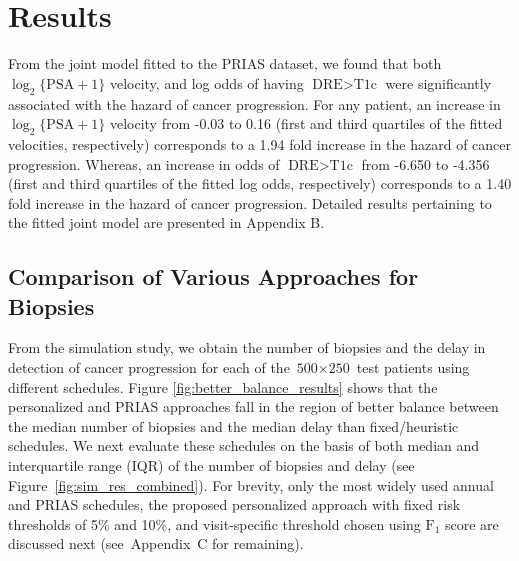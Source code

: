 
\section{Results}
\label{sec:results}
From the joint model fitted to the PRIAS dataset, we found that both $\log_2 \{\mbox{PSA} + 1\}$ velocity,  and log odds of having $\mbox{DRE} > \mbox{T1c}$  were significantly associated with the hazard of cancer progression. For any patient, an increase in $\log_2 \{\mbox{PSA} + 1\}$ velocity from -0.03 to 0.16 (first and third quartiles of the fitted velocities, respectively) corresponds to a 1.94 fold increase in the hazard of cancer progression. Whereas, an increase in odds of $\mbox{DRE} > \mbox{T1c}$ from -6.650 to -4.356 (first and third quartiles of the fitted log odds, respectively) corresponds to a 1.40 fold increase in the hazard of cancer progression. Detailed results pertaining to the fitted joint model are presented in Appendix B.

\subsection{Comparison of Various Approaches for Biopsies}
From the simulation study, we obtain the number of biopsies and the delay in detection of cancer progression for each of the ${\mbox{500} \times \mbox{250}}$ test patients using different schedules. Figure \ref{fig:better_balance_results} shows that the personalized and PRIAS approaches fall in the region of better balance between the median number of biopsies and the median delay than fixed/heuristic schedules. We next evaluate these schedules on the basis of both median and interquartile range (IQR) of the number of biopsies and delay (see Figure~\ref{fig:sim_res_combined}). For brevity, only the most widely used annual and PRIAS schedules, the proposed personalized approach with fixed risk thresholds of 5\% and 10\%, and visit-specific threshold chosen using $\mbox{F}_1$ score are discussed next (see~Appendix~C for remaining).

